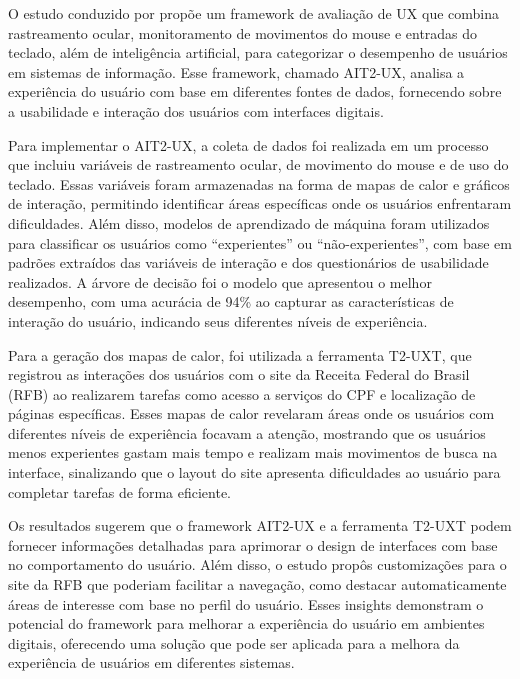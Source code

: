 O estudo conduzido por \textcite{SOUZA2021} propõe um framework de avaliação de UX que combina rastreamento ocular, monitoramento de movimentos do mouse e entradas do teclado, além de inteligência artificial, para categorizar o desempenho de usuários em sistemas de informação. Esse framework, chamado AIT2-UX, analisa a experiência do usuário com base em diferentes fontes de dados, fornecendo sobre a usabilidade e interação dos usuários com interfaces digitais.

Para implementar o AIT2-UX, a coleta de dados foi realizada em um processo que incluiu variáveis de rastreamento ocular, de movimento do mouse e de uso do teclado. Essas variáveis foram armazenadas na forma de mapas de calor e gráficos de interação, permitindo identificar áreas específicas onde os usuários enfrentaram dificuldades. Além disso, modelos de aprendizado de máquina foram utilizados para classificar os usuários como “experientes” ou “não-experientes”, com base em padrões extraídos das variáveis de interação e dos questionários de usabilidade realizados. A árvore de decisão foi o modelo que apresentou o melhor desempenho, com uma acurácia de 94\% ao capturar as características de interação do usuário, indicando seus diferentes níveis de experiência.

Para a geração dos mapas de calor, foi utilizada a ferramenta T2-UXT, que registrou as interações dos usuários com o site da Receita Federal do Brasil (RFB) ao realizarem tarefas como acesso a serviços do CPF e localização de páginas específicas. Esses mapas de calor revelaram áreas onde os usuários com diferentes níveis de experiência focavam a atenção, mostrando que os usuários menos experientes gastam mais tempo e realizam mais movimentos de busca na interface, sinalizando que o layout do site apresenta dificuldades ao usuário para completar tarefas de forma eficiente.

Os resultados sugerem que o framework AIT2-UX e a ferramenta T2-UXT podem fornecer informações detalhadas para aprimorar o design de interfaces com base no comportamento do usuário. Além disso, o estudo propôs customizações para o site da RFB que poderiam facilitar a navegação, como destacar automaticamente áreas de interesse com base no perfil do usuário. Esses insights demonstram o potencial do framework para melhorar a experiência do usuário em ambientes digitais, oferecendo uma solução que pode ser aplicada para a melhora da experiência de usuários em diferentes sistemas.